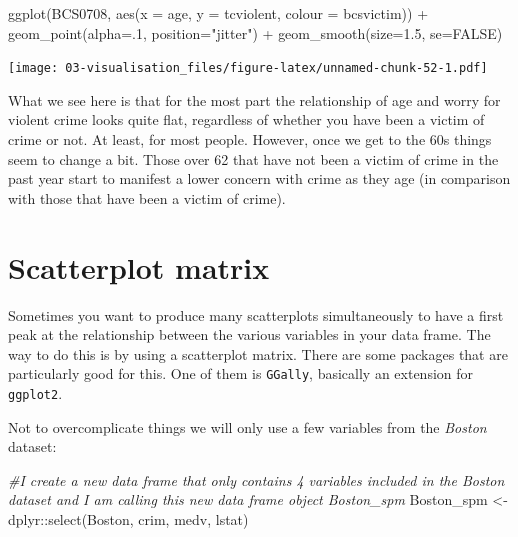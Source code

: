 \documentclass[
]{book}
\newenvironment{Shaded}{\begin{snugshade}}{\end{snugshade}}
\newcommand{\AttributeTok}[1]{\textcolor[rgb]{0.77,0.63,0.00}{#1}}
\newcommand{\CommentTok}[1]{\textcolor[rgb]{0.56,0.35,0.01}{\textit{#1}}}
\newcommand{\ConstantTok}[1]{\textcolor[rgb]{0.00,0.00,0.00}{#1}}
\newcommand{\DecValTok}[1]{\textcolor[rgb]{0.00,0.00,0.81}{#1}}
\newcommand{\FloatTok}[1]{\textcolor[rgb]{0.00,0.00,0.81}{#1}}
\newcommand{\FunctionTok}[1]{\textcolor[rgb]{0.00,0.00,0.00}{#1}}
\newcommand{\NormalTok}[1]{#1}
\newcommand{\OtherTok}[1]{\textcolor[rgb]{0.56,0.35,0.01}{#1}}
\newcommand{\SpecialCharTok}[1]{\textcolor[rgb]{0.00,0.00,0.00}{#1}}
\newcommand{\StringTok}[1]{\textcolor[rgb]{0.31,0.60,0.02}{#1}}
\begin{document}
\begin{Shaded}
\begin{Highlighting}[]
\FunctionTok{ggplot}\NormalTok{(BCS0708, }\FunctionTok{aes}\NormalTok{(}\AttributeTok{x =}\NormalTok{ age, }\AttributeTok{y =}\NormalTok{ tcviolent, }\AttributeTok{colour =}\NormalTok{ bcsvictim)) }\SpecialCharTok{+}
  \FunctionTok{geom\_point}\NormalTok{(}\AttributeTok{alpha=}\NormalTok{.}\DecValTok{1}\NormalTok{, }\AttributeTok{position=}\StringTok{"jitter"}\NormalTok{) }\SpecialCharTok{+}
  \FunctionTok{geom\_smooth}\NormalTok{(}\AttributeTok{size=}\FloatTok{1.5}\NormalTok{, }\AttributeTok{se=}\ConstantTok{FALSE}\NormalTok{)}
\end{Highlighting}
\end{Shaded}

\texttt{[image: 03-visualisation\_files/figure-latex/unnamed-chunk-52-1.pdf]}

What we see here is that for the most part the relationship of age and worry for violent crime looks quite flat, regardless of whether you have been a victim of crime or not. At least, for most people. However, once we get to the 60s things seem to change a bit. Those over 62 that have not been a victim of crime in the past year start to manifest a lower concern with crime as they age (in comparison with those that have been a victim of crime).

\hypertarget{scatterplot-matrix}{%
\section{Scatterplot matrix}\label{scatterplot-matrix}}

Sometimes you want to produce many scatterplots simultaneously to have a first peak at the relationship between the various variables in your data frame. The way to do this is by using a scatterplot matrix. There are some packages that are particularly good for this. One of them is \texttt{GGally}, basically an extension for \texttt{ggplot2}.

Not to overcomplicate things we will only use a few variables from the \emph{Boston} dataset:

\begin{Shaded}
\begin{Highlighting}[]
\CommentTok{\#I create a new data frame that only contains 4 variables included in the Boston dataset and I am calling this new data frame object Boston\_spm}
\NormalTok{Boston\_spm }\OtherTok{\textless{}{-}}\NormalTok{ dplyr}\SpecialCharTok{::}\FunctionTok{select}\NormalTok{(Boston, crim, medv, lstat)}
\end{Highlighting}
\end{Shaded}
\end{document}
